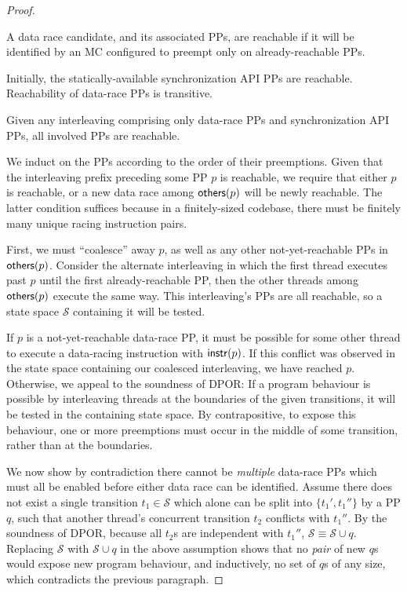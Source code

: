 \begin{proof}
\begin{definition}[Reachability]
A data race candidate, and its associated PPs, are reachable if it will be identified by an MC configured to preempt only on already-reachable PPs.
\end{definition}
Initially, the statically-available synchronization API PPs are reachable. Reachability of data-race PPs is transitive.

\begin{lemma}
	Given any interleaving comprising only data-race PPs and synchronization API PPs, all involved PPs are reachable.
	\label{lem:saturation}
\end{lemma}

We induct on the PPs according to the order of their preemptions.
Given that the interleaving prefix preceding some PP $p$ is reachable,
we require that either $p$ is reachable, or a new data race among $\mathsf{others}(p)$ will be newly reachable. %
The latter condition suffices because in a finitely-sized codebase, there must be finitely many unique racing instruction pairs.

First, we must ``coalesce'' away $p$, as well as any other not-yet-reachable PPs in $\mathsf{others}(p)$.
Consider the alternate interleaving in which the first thread executes past $p$ until the first already-reachable PP,
then the other threads among $\mathsf{others}(p)$ execute the same way.
This interleaving's PPs are all reachable, so a state space $\mathcal{S}$ containing it will be tested.

If $p$ is a not-yet-reachable data-race PP,
it must be possible for some other thread to execute a data-racing instruction with $\mathsf{instr}(p)$.
If this conflict was observed in the state space containing our coalesced interleaving, we have reached $p$.
Otherwise, we appeal to the soundness of DPOR:
If a program behaviour is possible by interleaving threads at the boundaries of the given transitions,
it will be tested in the containing state space.
By contrapositive, to expose this behaviour, one or more preemptions must occur in the middle of some transition, rather than at the boundaries.

We now show by contradiction there cannot be {\em multiple} data-race PPs which must all be enabled before either data race can be identified.
Assume there does not exist a single transition $t_1 \in \mathcal{S}$ which alone can be split into $\{t_1',t_1''\}$ by a PP $q$,
such that another thread's concurrent transition $t_2$ conflicts with $t_1''$.
By the soundness of DPOR, because all $t_2$s are independent with $t_1''$, $\mathcal{S} \equiv \mathcal{S} \cup q$.
Replacing $\mathcal{S}$ with $\mathcal{S} \cup q$ in the above assumption shows that no {\em pair} of new $q$s would expose new program behaviour, and inductively, no set of $q$s of any size, which contradicts the previous paragraph.


\end{proof}
